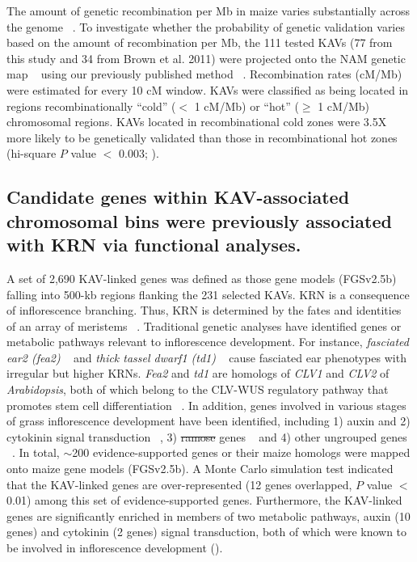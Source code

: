 \documentclass[10pt,letterpaper]{article}
\providecommand{\DIFaddtex}[1]{{\protect\color{blue}\uwave{#1}}} %
\providecommand{\DIFdeltex}[1]{{\protect\color{red}\sout{#1}}}                      %
\providecommand{\DIFaddbegin}{} %
\providecommand{\DIFaddend}{} %
\providecommand{\DIFdelbegin}{} %
\providecommand{\DIFdelend}{} %
\providecommand{\DIFadd}[1]{\texorpdfstring{\DIFaddtex{#1}}{#1}} %
\providecommand{\DIFdel}[1]{\texorpdfstring{\DIFdeltex{#1}}{}} %
\begin{document}
The amount of genetic recombination per Mb in maize varies substantially across the genome ~\cite{Fu2002}. To investigate whether the probability of genetic validation varies based on the amount of recombination per Mb, the 111 tested KAVs (77 from this study and 34 from Brown et al. 2011) were projected onto the NAM genetic map ~\cite{Buckler2009} using our previously published method ~\cite{Liu2009}. Recombination rates (cM/Mb) were estimated for every 10 cM window. KAVs were classified as being located in regions recombinationally “cold” ($<$ 1 cM/Mb) or “hot” ($\geq$ 1 cM/Mb) chromosomal regions. KAVs located in recombinational cold zones were 3.5X more likely to be genetically validated than those in recombinational hot zones (hi-square $P$ value $<$ 0.003; ). 

\subsection*{Candidate genes within KAV-associated chromosomal bins were previously associated with KRN via functional analyses.}
A set of 2,690 KAV-linked genes was defined as those gene models (FGSv2.5b) falling into 500-kb regions flanking the 231 selected KAVs. KRN is a consequence of inflorescence branching. Thus, KRN is determined by the fates and identities of an array of meristems ~\cite{Barazesh2008}. Traditional genetic analyses have identified genes or metabolic pathways relevant to inflorescence development. For instance, \emph{fasciated ear2 (fea2)} ~\cite{Bommert2013} and \emph{thick tassel dwarf1 (td1)} ~\cite{Bommert2005} cause fasciated ear phenotypes with irregular but higher KRNs. \emph{Fea2} and \emph{td1} are homologs of \emph{CLV1} and \emph{CLV2} of \emph{Arabidopsis}, both of which belong to the CLV-WUS regulatory pathway that promotes stem cell differentiation ~\cite{Clark2001}. In addition, genes involved in various stages of grass inflorescence development have been identified, including 1) auxin and 2) cytokinin signal transduction ~\cite{Barazesh2008, Sigmon2010}, 3) \DIFdelbegin \DIFdel{ramose }\DIFdelend \DIFaddbegin \DIFadd{ramosa }\DIFaddend genes ~\cite{Bortiri2006} and 4) other ungrouped genes ~\cite{McSteen2001, Upadyayula2006, Xu2011}. In total, \DIFdelbegin \DIFdel{$\sim$}\DIFdelend \DIFaddbegin \DIFadd{~}\DIFaddend 200 evidence-supported genes or their maize homologs were mapped onto maize gene models (FGSv2.5b). A Monte Carlo simulation test indicated that the KAV-linked genes are over-represented (12 genes overlapped, $P$ value $<$ 0.01) among this set of evidence-supported genes. Furthermore, the KAV-linked genes are significantly enriched in members of two metabolic pathways, auxin (10 genes) and cytokinin (2 genes) signal transduction, both of which were known to be involved in inflorescence development (). 
\end{document}
